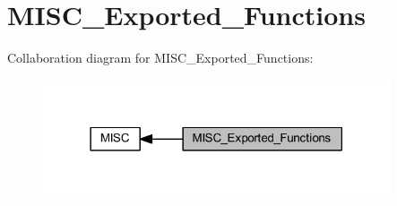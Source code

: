 \hypertarget{group___m_i_s_c___exported___functions}{}\section{M\+I\+S\+C\+\_\+\+Exported\+\_\+\+Functions}
\label{group___m_i_s_c___exported___functions}
Collaboration diagram for M\+I\+S\+C\+\_\+\+Exported\+\_\+\+Functions\+:
\nopagebreak
\begin{figure}[H]
\begin{center}
\leavevmode
\includegraphics[width=290pt]{group___m_i_s_c___exported___functions}
\end{center}
\end{figure}
